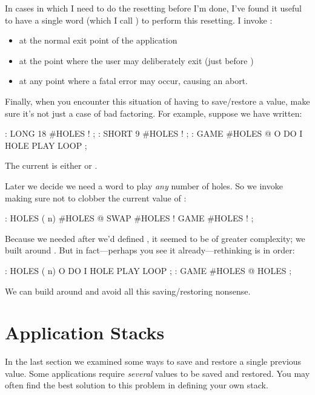 In cases in which I need to do the resetting before I'm done, I've found it
useful to have a single word (which I call ) to perform this
resetting. I invoke :

\begin{itemize}
\item at the normal exit point of the application
\item at the point where the user may deliberately exit (just before )
\item at any point where a fatal error may occur, causing an abort.
\end{itemize}

Finally, when you encounter this situation of having to save/restore a
value, make sure it's not just a case of bad factoring. For example,
suppose we have written:

\begin{Code}
: LONG   18 #HOLES ! ;
: SHORT   9 #HOLES ! ;
: GAME   #HOLES @  O DO  I HOLE PLAY  LOOP ;
\end{Code}
The current  is either  or .

Later we decide we need a word to play \emph{any} number of holes. So
we invoke  making sure not to clobber the current value of
:

\begin{Code}
: HOLES  ( n)  #HOLES @  SWAP #HOLES !  GAME  #HOLES ! ;
\end{Code}
Because we needed  after we'd defined , it
seemed to be of greater complexity; we built  around
. But in fact---perhaps you see it already---rethinking is
in order:

\begin{Code}
: HOLES ( n)  O DO  I HOLE PLAY  LOOP ;
: GAME   #HOLES @ HOLES ;
\end{Code}
We can build  around  and avoid all this
saving/restoring nonsense.

\section{Application Stacks}

In the last section we examined some ways to save and restore a single
previous value. Some applications require \emph{several} values to be saved and
restored. You may often find the best solution to this problem in defining
your own stack.

